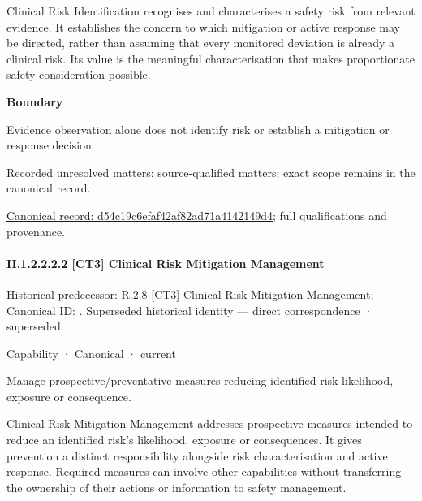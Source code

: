 Clinical Risk Identification recognises and characterises a safety risk from relevant evidence. It establishes the concern to which mitigation or active response may be directed, rather than assuming that every monitored deviation is already a clinical risk. Its value is the meaningful characterisation that makes proportionate safety consideration possible.



\textbf{Boundary}



Evidence observation alone does not identify risk or establish a mitigation or response decision.


{\small Recorded unresolved matters: source-qualified matters; exact scope remains in the canonical record.}\par
{\footnotesize \href{../../../../../../../continuum/strategy/capability/d54c19c6efaf42af82ad71a4142149d4.md}{Canonical record: d54c19c6efaf42af82ad71a4142149d4}; full qualifications and provenance.}\par
\paragraph*{II.1.2.2.2.2 [CT3] Clinical Risk Mitigation Management}
\label{navigation:II.1.2.2.2.2}

{\small Historical predecessor: R.2.8 \hyperref[element:0bd3311d89af45bb935fde20e719369c]{[CT3] Clinical Risk Mitigation Management}; Canonical ID: \texttt{}. Superseded historical identity — direct correspondence · superseded.}\par
\label{element:2c232ade21ec45619c3ee4e928bd97ee}
{\small Capability · Canonical · current}\par

Manage prospective/preventative measures reducing identified risk likelihood, exposure or consequence.



Clinical Risk Mitigation Management addresses prospective measures intended to reduce an identified risk's likelihood, exposure or consequences. It gives prevention a distinct responsibility alongside risk characterisation and active response. Required measures can involve other capabilities without transferring the ownership of their actions or information to safety management.



